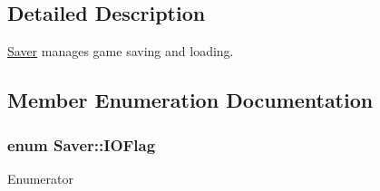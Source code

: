 \subsection{Detailed Description}
\hyperlink{classSaver}{Saver} manages game saving and loading. 

\subsection{Member Enumeration Documentation}
\hypertarget{classSaver_a8a4458961f17bff6b74c5371913b96cb}{}
\subsubsection[{I\+O\+Flag}]{\setlength{\rightskip}{0pt plus 5cm}enum {\bf Saver\+::\+I\+O\+Flag}\hspace{0.3cm}{\ttfamily [private]}}\label{classSaver_a8a4458961f17bff6b74c5371913b96cb}
\begin{Desc}
\item[Enumerator]\par
\begin{description}
\item[{\em 
\hypertarget{classSaver_a8a4458961f17bff6b74c5371913b96cba95ba68df9b87cd417334814cf93fd64e}{}I\+O\+\_\+\+C\+O\+N\+T\+I\+N\+U\+E\label{classSaver_a8a4458961f17bff6b74c5371913b96cba95ba68df9b87cd417334814cf93fd64e}
}]\item[{\em 
\hypertarget{classSaver_a8a4458961f17bff6b74c5371913b96cbaf96071109d6afd5fc6886f7822ee794e}{}I\+O\+\_\+\+S\+T\+O\+P\label{classSaver_a8a4458961f17bff6b74c5371913b96cbaf96071109d6afd5fc6886f7822ee794e}
}]\end{description}
\end{Desc}
\hypertarget{classSaver_a4b7186206c8281c11545f6f470ce1c4c}{}

